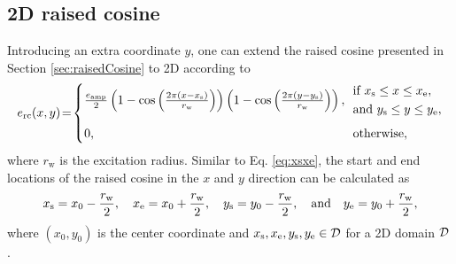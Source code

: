 \subsection{2D raised cosine}\label{sec:2DraisedCos}
Introducing an extra coordinate $y$, one can extend the raised cosine presented in Section \ref{sec:raisedCosine} to 2D according to 
\begin{equation}\label{eq:raisedCosCont2D}
    e_\text{rc}(x,y)\! =\! 
    \begin{cases}
        \!\frac{e_\text{amp}}{2}\left(1 - \cos\left(\frac{2\pi (x - x_\stxt)}{r_\text{w}}\right)\right)\left(1 - \cos\left(\frac{2\pi (y - y_\stxt)}{r_\text{w}}\right)\right), & 
        \!\!\!\begin{aligned}
            &\text{if } x_\stxt \leq x \leq x_\etxt, \\
            &\text{and } y_\stxt \leq y \leq y_\etxt,
        \end{aligned}\\[1.25em]
        \!0, &\!\! \text{otherwise},
    \end{cases}
\end{equation}
where $r_\text{w}$ is the excitation radius. Similar to Eq. \eqref{eq:xsxe}, the start and end locations of the raised cosine in the $x$ and $y$ direction can be calculated as
\begin{equation*}
    x_{\text{s}} = x_0 - 
    \frac{r_\text{w}}{2}, \quad x_{\text{e}} = x_0 + \frac{r_\text{w}}{2}, \quad y_{\text{s}} = y_0 - 
    \frac{r_\text{w}}{2}, \quad \text{and} \quad y_{\text{e}} = y_0 + \frac{r_\text{w}}{2},
\end{equation*}
where $(x_0, y_0)$ is the center coordinate and $x_{\text{s}}, x_{\text{e}}, y_{\text{s}},  y_\text{e}\in \mathcal{D}$ for a 2D domain $\mathcal{D}$.

